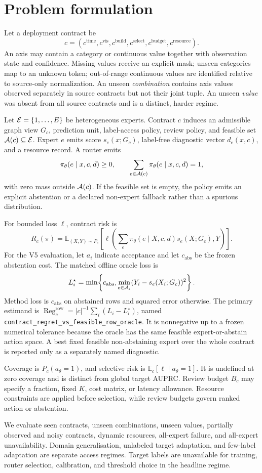 \section{Problem formulation}



Let a deployment contract be
\[
c=(c^{\mathrm{time}},c^{\mathrm{vis}},c^{\mathrm{build}},c^{\mathrm{select}},c^{\mathrm{budget}},c^{\mathrm{resource}}).
\]
An axis may contain a category or continuous value together with observation state and confidence. Missing values receive an explicit mask; unseen categories map to an unknown token; out-of-range continuous values are identified relative to source-only normalization. An unseen \emph{combination} contains axis values observed separately in source contracts but not their joint tuple. An unseen \emph{value} was absent from all source contracts and is a distinct, harder regime.

Let \(\mathcal{E}=\{1,\ldots,E\}\) be heterogeneous experts. Contract \(c\) induces an admissible graph view \(G_c\), prediction unit, label-access policy, review policy, and feasible set \(\mathcal{A}(c)\subseteq\mathcal{E}\). Expert \(e\) emits score \(s_e(x;G_c)\), label-free diagnostic vector \(d_e(x,c)\), and a resource record. A router emits
\[
\pi_\theta(e\mid x,c,d)\geq 0,\qquad
\sum_{e\in\mathcal{A}(c)}\pi_\theta(e\mid x,c,d)=1,
\]
with zero mass outside \(\mathcal{A}(c)\). If the feasible set is empty, the policy emits an explicit abstention or a declared non-expert fallback rather than a spurious distribution.

For bounded loss \(\ell\), contract risk is
\[
R_c(\pi)=\mathbb E_{(X,Y)\sim P_c}\!\left[\ell\!\left(\sum_e\pi_\theta(e\mid X,c,d)s_e(X;G_c),Y\right)\right].
\]
For the V5 evaluation, let \(a_i\) indicate acceptance and let \(c_{\mathrm{abs}}\) be the frozen abstention cost. The matched offline oracle loss is
\[
L_i^\star=\min\!\left\{c_{\mathrm{abs}},\min_{e\in\mathcal{A}_i}(Y_i-s_e(X_i;G_c))^2\right\}.
\]
Method loss is \(c_{\mathrm{abs}}\) on abstained rows and squared error otherwise. The primary estimand is
\(\operatorname{Reg}^{\mathrm{row}}_c=|c|^{-1}\sum_i(L_i-L_i^\star)\), named \texttt{contract\_regret\_vs\_feasible\_row\_oracle}. It is nonnegative up to a frozen numerical tolerance because the oracle has the same feasible expert-or-abstain action space. A best fixed feasible non-abstaining expert over the whole contract is reported only as a separately named diagnostic.

Coverage is \(P_c(a_\theta=1)\), and selective risk is \(\mathbb E_c[\ell\mid a_\theta=1]\). It is undefined at zero coverage and is distinct from global target AUPRC. Review budget \(B_c\) may specify a fraction, fixed \(K\), cost matrix, or latency allowance. Resource constraints are applied before selection, while review budgets govern ranked action or abstention.

We evaluate seen contracts, unseen combinations, unseen values, partially observed and noisy contracts, dynamic resources, all-expert failure, and all-expert unavailability. Domain generalisation, unlabeled target adaptation, and few-label adaptation are separate access regimes. Target labels are unavailable for training, router selection, calibration, and threshold choice in the headline regime.

